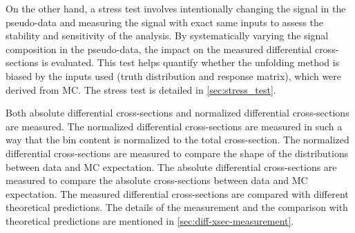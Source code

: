 On the other hand, a stress test involves intentionally changing the signal in the pseudo-data and measuring the signal with exact same inputs to assess the stability and sensitivity of the analysis. By systematically varying the signal composition in the pseudo-data, the impact on the measured differential cross-sections is evaluated. This test helps quantify whether the unfolding method is biased by the inputs used (truth distribution and response matrix), which were derived from MC. The stress test is detailed in \cref{sec:stress_test}.

Both absolute differential cross-sections and normalized differential cross-sections are measured. The normalized differential cross-sections are measured in such a way that the bin content is normalized to the total cross-section. The normalized differential cross-sections are measured to compare the shape of the distributions between data and MC expectation. The absolute differential cross-sections are measured to compare the absolute cross-sections between data and MC expectation. The measured differential cross-sections are compared with different theoretical predictions. The details of the measurement and the comparison with theoretical predictions are mentioned in \cref{sec:diff-xsec-measurement}.